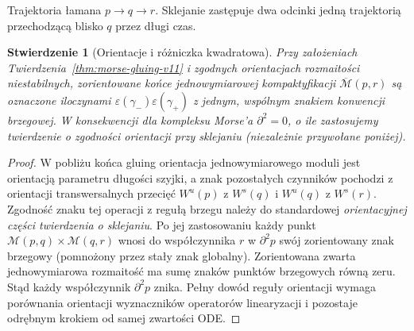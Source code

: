 \documentclass[11pt,a4paper,oneside]{report}
\theoremstyle{plain}
\newtheorem{stwierdzenie}[twierdzenie]{Stwierdzenie}
\theoremstyle{definition}
\theoremstyle{remark}
\begin{document}
\begin{center}
\par\smallskip\small Trajektoria łamana $p\to q\to r$.
Sklejanie zastępuje dwa odcinki jedną trajektorią
przechodzącą blisko $q$ przez długi czas.
\end{center}

\begin{stwierdzenie}[Orientacje i różniczka kwadratowa]
\label{prop:morse-d2-analytic-v11}
Przy założeniach Twierdzenia~\ref{thm:morse-gluing-v11}
i zgodnych orientacjach rozmaitości niestabilnych,
zorientowane końce jednowymiarowej kompaktyfikacji
$\overline{\mathcal M}(p,r)$ są oznaczone iloczynami
$\varepsilon(\gamma_-)\varepsilon(\gamma_+)$
z jednym, wspólnym znakiem konwencji brzegowej.
W konsekwencji dla kompleksu Morse'a $\partial^2=0$,
o ile zastosujemy twierdzenie o zgodności orientacji
przy sklejaniu (niezależnie przywołane poniżej).
\end{stwierdzenie}
\begin{proof}
W pobliżu końca gluing orientacja jednowymiarowego
moduli jest orientacją parametru długości szyjki,
a znak pozostałych czynników pochodzi z orientacji
transwersalnych przecięć $W^u(p)$ z $W^s(q)$ i
$W^u(q)$ z $W^s(r)$.
Zgodność znaku tej operacji z regułą brzegu należy do
standardowej \emph{orientacyjnej części twierdzenia
o sklejaniu}. Po jej zastosowaniu każdy punkt
\(\mathcal M(p,q)\times\mathcal M(q,r)\)
wnosi do współczynnika $r$ w $\partial^2p$ swój
zorientowany znak brzegowy (pomnożony przez stały
znak globalny). Zorientowana zwarta
jednowymiarowa rozmaitość ma sumę znaków punktów
brzegowych równą zeru. Stąd każdy współczynnik
$\partial^2p$ znika. Pełny dowód reguły orientacji
wymaga porównania orientacji wyznaczników operatorów
linearyzacji i pozostaje odrębnym krokiem od
samej zwartości ODE.
\end{proof}
\end{document}
